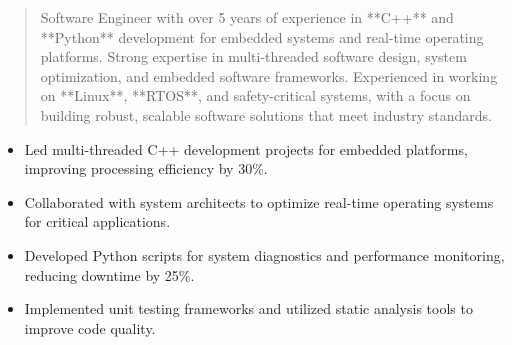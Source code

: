 



\makecvheader

\begin{quote}
  \noindent
  Software Engineer with over 5 years of experience in **C++** and **Python** development for embedded systems and real-time operating platforms. Strong expertise in multi-threaded software design, system optimization, and embedded software frameworks. Experienced in working on **Linux**, **RTOS**, and safety-critical systems, with a focus on building robust, scalable software solutions that meet industry standards.
\end{quote}

\par\smallskip
\noindent
\begin{minipage}{20cm}
  \begin{minipage}{9.75cm}
    \begin{itemize}
      \item Led multi-threaded C++ development projects for embedded platforms, improving processing efficiency by 30\%.
      \item Collaborated with system architects to optimize real-time operating systems for critical applications.
    \end{itemize}
  \end{minipage}
  \hfill
  \begin{minipage}{9.75cm}
    \begin{itemize}
      \item Developed Python scripts for system diagnostics and performance monitoring, reducing downtime by 25\%.
      \item Implemented unit testing frameworks and utilized static analysis tools to improve code quality.
    \end{itemize}
  \end{minipage}
\end{minipage}
\par\smallskip
\divider

